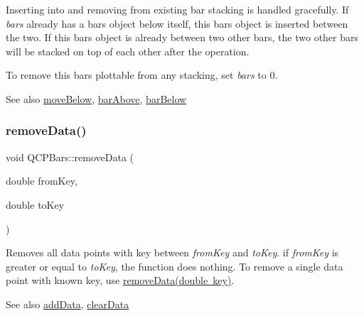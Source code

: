 Inserting into and removing from existing bar stacking is handled gracefully. If {\itshape bars} already has a bars object below itself, this bars object is inserted between the two. If this bars object is already between two other bars, the two other bars will be stacked on top of each other after the operation.

To remove this bars plottable from any stacking, set {\itshape bars} to 0.

\begin{DoxySeeAlso}{See also}
\mbox{\hyperlink{class_q_c_p_bars_a69fc371346980f19177c3d1ecdad78ee}{move\+Below}}, \mbox{\hyperlink{class_q_c_p_bars_ab97f2acd9f6cb40d2cc3c33d278f0e78}{bar\+Above}}, \mbox{\hyperlink{class_q_c_p_bars_a1b58664864b141f45e02044a855b3213}{bar\+Below}} 
\end{DoxySeeAlso}
\mbox{\label{class_q_c_p_bars_a1fe9bcb57d670defea1bb65cadf43765}} 
\subsubsection{\texorpdfstring{remove\+Data()}{removeData()}\hspace{0.1cm}{\footnotesize\ttfamily [1/2]}}
{\footnotesize\ttfamily void Q\+C\+P\+Bars\+::remove\+Data (\begin{DoxyParamCaption}\item[{double}]{from\+Key,  }\item[{double}]{to\+Key }\end{DoxyParamCaption})}

Removes all data points with key between {\itshape from\+Key} and {\itshape to\+Key}. if {\itshape from\+Key} is greater or equal to {\itshape to\+Key}, the function does nothing. To remove a single data point with known key, use \mbox{\hyperlink{class_q_c_p_bars_a837cc9848ad3edd40a6130b508493f93}{remove\+Data(double key)}}.

\begin{DoxySeeAlso}{See also}
\mbox{\hyperlink{class_q_c_p_bars_a1f29cf08615040993209147fa68de3f2}{add\+Data}}, \mbox{\hyperlink{class_q_c_p_bars_a11dbbd707132f07f862dff13c5789c2b}{clear\+Data}} 
\end{DoxySeeAlso}
\mbox{\label{class_q_c_p_bars_a837cc9848ad3edd40a6130b508493f93}} 
